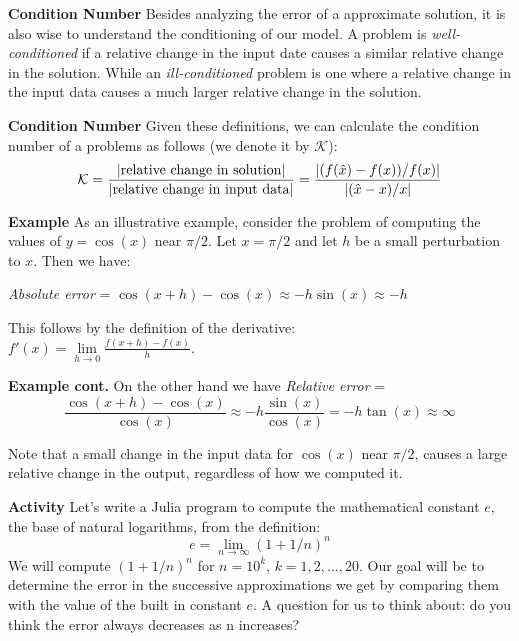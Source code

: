 \documentclass[xcolor=dvipsnames]{beamer}
\begin{document}
\begin{frame}
{\bf Condition Number}
Besides analyzing the error of a approximate solution, it is also wise to understand the conditioning of our model. 
\vfill
\pause
A problem is \emph{well-conditioned} if a relative change in the input date causes a similar relative change in the solution. 
\vfill
\pause
While an \emph{ill-conditioned} problem is one where a relative change in the input data causes a much larger relative change in the solution.
\vfill 
\end{frame}

\begin{frame}
{\bf Condition Number}
Given these definitions, we can calculate the condition number of a problems as follows (we denote it by $\mathcal{K}$):
\[\mathcal{K} = \frac{|\textnormal{relative change in solution}|}{|\textnormal{relative change in input data}|} = \frac{|(f(\hat{x})-f(x))/f(x)|}{|(\hat{x}-x)/x|}\]
\end{frame}

\begin{frame}
{\bf Example } As an illustrative example, consider the problem of computing the values of $y = \cos(x)$ near $\pi/2$. \vfill \pause Let $x = \pi/2$ and let $h$ be a small perturbation to $x$. Then we have:
\pause
\begin{center}
\emph{Absolute error} = $\cos(x+h) - \cos(x) \approx -h\sin(x) \approx -h$
\end{center}
\pause
\vfill
This follows by the definition of the derivative: \\
\hfill $\displaystyle f'(x) = \lim\limits_{h \rightarrow 0} \frac{f(x+h) - f(x)}{h}$. 
\end{frame}

\begin{frame}
{\bf Example cont.}
On the other hand we have \vfill \pause
\emph{Relative error} = \\
\[\frac{\cos(x+h) - \cos(x)}{\cos(x)} \approx -h\frac{\sin(x)}{\cos(x)} = -h\tan(x) \approx \infty\]

\vfill
\pause
Note that a small change in the input data for $\cos(x)$ near $\pi/2$, causes a large relative change in the output, regardless of how we computed it.
\end{frame}

\begin{frame}
{\bf Activity} 
Let's write a Julia program to compute the mathematical constant $e$, the base of natural logarithms, from the definition:
\[ e = \lim\limits_{n \rightarrow \infty} (1+1/n)^n \]
\vfill
\pause
We will compute $(1 + 1/n)^n$ for $n = 10^k$, $k = 1, 2, ..., 20$. Our goal will be to determine the error in the successive approximations we get by comparing them with the value of the built in constant $e$. 
\vfill
\pause
A question for us to think about: do you think the error always decreases as n increases? \\
\end{frame}
\end{document}
